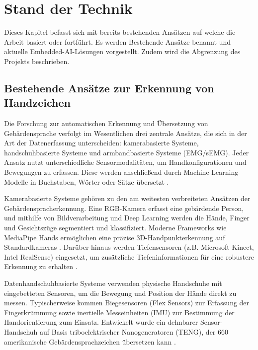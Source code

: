 \chapter{Stand der Technik}\label{ch:stand-der-technik}

Dieses Kapitel befasst sich mit bereits bestehenden Ansätzen auf welche die Arbeit basiert oder fortführt. Es werden Bestehende Ansätze benannt und aktuelle Embedded-AI-Lösungen vorgestellt. Zudem wird die Abgrenzung des Projekts beschrieben.

\section{Bestehende Ansätze zur Erkennung von Handzeichen}\label{sec:bestehende-ansaetze}

Die Forschung zur automatischen Erkennung und Übersetzung von Gebärdensprache verfolgt im Wesentlichen drei zentrale Ansätze, die sich in der Art der Datenerfassung unterscheiden: kamerabasierte Systeme, handschuhbasierte Systeme und armbandbasierte Systeme (EMG/sEMG). Jeder Ansatz nutzt unterschiedliche Sensormodalitäten, um Handkonfigurationen und Bewegungen zu erfassen. Diese werden anschließend durch Machine-Learning-Modelle in Buchstaben, Wörter oder Sätze übersetzt \cite{rastgooSignLanguageRecognition2021}.

Kamerabasierte Systeme gehören zu den am weitesten verbreiteten Ansätzen der Gebärdenspracherkennung. Eine RGB-Kamera erfasst eine gebärdende Person, und mithilfe von Bildverarbeitung und Deep Learning werden die Hände, Finger und Gesichtszüge segmentiert und klassifiziert. Moderne Frameworks wie MediaPipe Hands ermöglichen eine präzise 3D-Handpunkterkennung auf Standardkameras \cite{OnDeviceRealTimeHand}. Darüber hinaus werden Tiefensensoren (z.B. Microsoft Kinect, Intel RealSense) eingesetzt, um zusätzliche Tiefeninformationen für eine robustere Erkennung zu erhalten \cite{rastgooSignLanguageRecognition2021}.

Datenhandschuhbasierte Systeme verwenden physische Handschuhe mit eingebetteten \linebreak Sensoren, um die Bewegung und Position der Hände direkt zu messen. Typischerweise kommen Biegesensoren (Flex Sensors) zur Erfassung der Fingerkrümmung sowie inertielle Messeinheiten (IMU) zur Bestimmung der Handorientierung zum Einsatz. Entwickelt wurde ein dehnbarer Sensor-Handschuh auf Basis triboelektrischer Nanogeneratoren (TENG), der 660 amerikanische Gebärdensprachzeichen übersetzen kann \cite{zhouSigntospeechTranslationUsing2020}.

